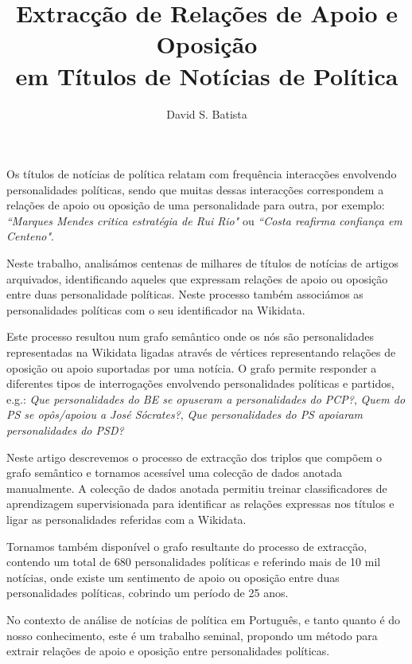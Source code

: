 \documentclass[a4paper, twocolumn, 11pt, twoside]{article}
\title{Extracção de Relações de Apoio e Oposição \\em Títulos de Notícias de Política}
\author{
  David S. Batista \\
  \email{dsbatista@gmail.com} 
}
\begin{document}
\maketitle

\begin{resumo}
Os títulos de notícias de política relatam com frequência interacções envolvendo personalidades políticas, sendo que muitas dessas interacções correspondem a relações de apoio ou oposição de uma personalidade para outra, por exemplo: \textit{``Marques Mendes critica estratégia de Rui Rio"} ou \textit{``Costa reafirma confiança em Centeno"}.

Neste trabalho, analisámos centenas de milhares de títulos de notícias de artigos arquivados, identificando aqueles que expressam relações de apoio ou oposição entre duas personalidade políticas. Neste processo também associámos as personalidades políticas com o seu identificador na Wikidata. 

Este processo resultou num grafo semântico onde os nós são personalidades representadas na Wikidata ligadas através de vértices representando relações de oposição ou apoio suportadas por uma notícia. O grafo permite responder a diferentes tipos de interrogações envolvendo personalidades políticas e partidos, e.g.: \textit{Que personalidades do BE se opuseram a personalidades do PCP?}, \textit{Quem do PS se opôs/apoiou a José Sócrates?}, \textit{Que personalidades do PS apoiaram personalidades do PSD?}

Neste artigo descrevemos o processo de extracção dos triplos que compõem o grafo semântico e tornamos acessível uma colecção de dados anotada manualmente. A colecção de dados anotada permitiu treinar classificadores de aprendizagem supervisionada para identificar as relações expressas nos títulos e ligar as personalidades referidas com a Wikidata. 

Tornamos também disponível o grafo resultante do processo de extracção, contendo um total de 680 personalidades políticas e referindo mais de 10 mil notícias, onde existe um sentimento de apoio ou oposição entre duas personalidades políticas, cobrindo um período de 25 anos.

No contexto de análise de notícias de política em Português, e tanto quanto é do nosso conhecimento, este é um trabalho seminal, propondo um método para extrair relações de apoio e oposição entre personalidades políticas.
\end{resumo}
\end{document}
